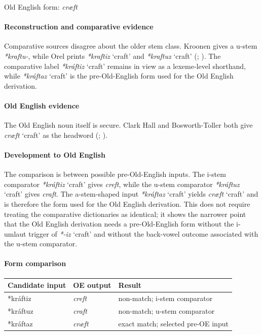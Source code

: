 \documentclass[
  british,
  a4paper,
]{article}
\newcounter{none} %
\providecommand{\Recon}[1]{\emph{*#1}}
\begin{document}
Old English form: \emph{cræft}

\paragraph{Reconstruction and comparative
evidence}\label{reconstruction-and-comparative-evidence-85}

Comparative sources disagree about the older stem class. Kroonen gives a
u-stem \emph{*kraftu-}, while Orel prints \Recon{kraftiz} `craft' and
\Recon{kraftuz} `craft' (;
). The comparative label
\Recon{kráftiz} `craft' remains in view as a lexeme-level shorthand,
while \Recon{kráftaz} `craft' is the pre-Old-English form used for the
Old English derivation.

\paragraph{Old English evidence}\label{old-english-evidence-85}

The Old English noun itself is secure. Clark Hall and Bosworth-Toller
both give \emph{cræft} `craft' as the headword
(;
).

\paragraph{Development to Old
English}\label{development-to-old-english-85}

The comparison is between possible pre-Old-English inputs. The i-stem
comparator \Recon{kráftiz} `craft' gives \emph{creft}, while the u-stem
comparator \Recon{kráftuz} `craft' gives \emph{craft}. The a-stem-shaped
input \Recon{kráftaz} `craft' yields \emph{cræft} `craft' and is
therefore the form used for the Old English derivation. This does not
require treating the comparative dictionaries as identical; it shows the
narrower point that the Old English derivation needs a pre-Old-English
form without the i-umlaut trigger of \Recon{-iz} `craft' and without the
back-vowel outcome associated with the u-stem comparator.

\paragraph{Form comparison}\label{form-comparison-5}

{\def\LTcaptype{none} %
\begin{longtable}[]{@{}lll@{}}
\toprule\noalign{}
Candidate input & OE output & Result \\
\midrule\noalign{}
\endhead
\bottomrule\noalign{}
\endlastfoot
*kráftiz & \emph{creft} & non-match; i-stem comparator \\
*kráftuz & \emph{craft} & non-match; u-stem comparator \\
*kráftaz & \emph{cræft} & exact match; selected pre-OE input \\
\end{longtable}
}
\end{document}
